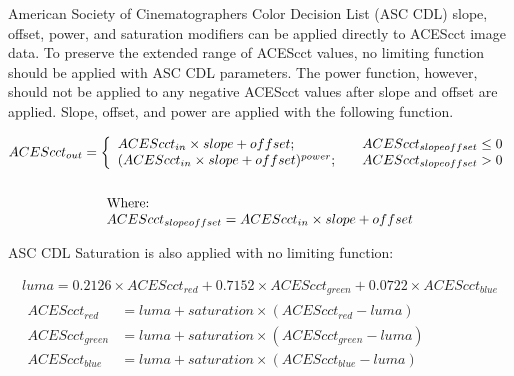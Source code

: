 \label{appendixA}

American Society of Cinematographers Color Decision List (ASC CDL) slope, offset, power, and saturation modifiers can be applied directly to ACEScct image data. To preserve the extended range of ACEScct values, no limiting function should be applied with ASC CDL parameters. The power function, however, should not be applied to any negative ACEScct values after slope and offset are applied. Slope, offset, and power are applied with the following function.


\begin{gather*} 
    ACEScct_{out} = \left\{ 
    \begin{array}{l r }
        ACEScct_{in} \times slope + offset; & \quad ACEScct_{slopeoffset} \leq 0 \\
        (ACEScct_{in} \times slope + offset)^{power}; & \quad ACEScct_{slopeoffset} > 0 \\
    \end{array} \right. \\ 
    \\
    \begin{array}{l}
    \text{Where:}\\
    ACEScct_{slopeoffset} = ACEScct_{in} \times slope + offset
    \end{array}
\end{gather*}

ASC CDL Saturation is also applied with no limiting function:

\begin{gather*}
    luma = 0.2126 \times ACEScct_{red} + 0.7152 \times ACEScct_{green} + 0.0722 \times ACEScct_{blue} \\
    \begin{aligned}
        ACEScct_{red} &= luma + saturation \times (ACEScct_{red} - luma) \\
        ACEScct_{green} &= luma + saturation \times (ACEScct_{green} - luma) \\        
        ACEScct_{blue} &= luma + saturation \times (ACEScct_{blue} - luma) \\ 
    \end{aligned}
\end{gather*}
    